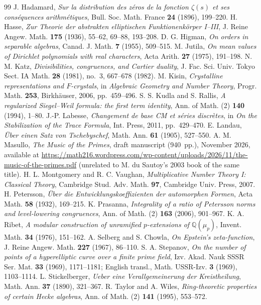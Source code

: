 \documentclass[11pt]{amsart}
\newcommand{\QQ}{\mathbb{Q}}
\theoremstyle{definition}
\theoremstyle{remark}
\begin{document}
\begin{thebibliography}{99}
 J. Hadamard, \emph{Sur la distribution des z\'eros de la fonction $\zeta(s)$ et ses cons\'equences arithm\'etiques}, Bull. Soc. Math. France \textbf{24} (1896), 199--220.
 H. Hasse, \emph{Zur Theorie der abstrakten elliptischen Funktionenk\"orper I--III}, J. Reine Angew. Math. \textbf{175} (1936), 55--62, 69--88, 193--208.
 D. G. Higman, \emph{On orders in separable algebras}, Canad. J. Math. \textbf{7} (1955), 509--515.
 M. Jutila, \emph{On mean values of Dirichlet polynomials with real characters}, Acta Arith. \textbf{27} (1975), 191--198.
 N. M. Katz, \emph{Divisibilities, congruences, and Cartier duality}, J. Fac. Sci. Univ. Tokyo Sect. IA Math. \textbf{28} (1981), no.~3, 667--678 (1982).
 M. Kisin, \emph{Crystalline representations and $F$-crystals}, in \emph{Algebraic Geometry and Number Theory}, Progr. Math. \textbf{253}, Birkh\"auser, 2006, pp.~459--496.
 S. S. Kudla and S. Rallis, \emph{A regularized Siegel--Weil formula: the first term identity}, Ann. of Math. (2) \textbf{140} (1994), 1--80.
 J.-P. Labesse, \emph{Changement de base CM et s\'eries discr\`etes}, in \emph{On the Stabilization of the Trace Formula}, Int. Press, 2011, pp.~429--470.
 E. Landau, \emph{\"Uber einen Satz von Tschebyschef}, Math. Ann. \textbf{61} (1905), 527--550.
 A. M. Masullo, \emph{The Music of the Primes}, draft manuscript (940~pp.), November 2026, available at \url{https://math216.wordpress.com/wp-content/uploads/2026/11/the-music-of-the-primes.pdf} (unrelated to M. du Sautoy's 2003 book of the same title).
 H. L. Montgomery and R. C. Vaughan, \emph{Multiplicative Number Theory I: Classical Theory}, Cambridge Stud. Adv. Math. \textbf{97}, Cambridge Univ. Press, 2007.
 H. Petersson, \emph{\"Uber die Entwicklungskoeffizienten der automorphen Formen}, Acta Math. \textbf{58} (1932), 169--215.
 K. Prasanna, \emph{Integrality of a ratio of Petersson norms and level-lowering congruences}, Ann. of Math. (2) \textbf{163} (2006), 901--967.
 K. A. Ribet, \emph{A modular construction of unramified $p$-extensions of $\QQ(\mu_p)$}, Invent. Math. \textbf{34} (1976), 151--162.
 A. Selberg and S. Chowla, \emph{On Epstein's zeta-function}, J. Reine Angew. Math. \textbf{227} (1967), 86--110.
 S. A. Stepanov, \emph{On the number of points of a hyperelliptic curve over a finite prime field}, Izv. Akad. Nauk SSSR Ser. Mat. \textbf{33} (1969), 1171--1181; English transl., Math. USSR-Izv. \textbf{3} (1969), 1103--1114.
 L. Stickelberger, \emph{Ueber eine Verallgemeinerung der Kreistheilung}, Math. Ann. \textbf{37} (1890), 321--367.
 R. Taylor and A. Wiles, \emph{Ring-theoretic properties of certain Hecke algebras}, Ann. of Math. (2) \textbf{141} (1995), 553--572.
\end{thebibliography}
\end{document}
